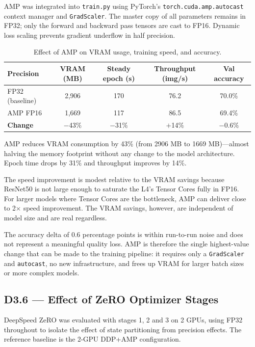 AMP was integrated into \texttt{train.py} using PyTorch's
\texttt{torch.cuda.amp.autocast} context manager and \texttt{GradScaler}.
The master copy of all parameters remains in FP32; only the forward and
backward pass tensors are cast to FP16. Dynamic loss scaling prevents
gradient underflow in half precision.

\begin{table}[h]
\centering
\caption{Effect of AMP on VRAM usage, training speed, and accuracy.}
\label{tab:amp}
\begin{tabular}{lcccc}
\toprule
\textbf{Precision} & \textbf{VRAM (MB)} & \textbf{Steady epoch (s)}
  & \textbf{Throughput (img/s)} & \textbf{Val accuracy} \\
\midrule
FP32 (baseline) & 2{,}906 & 170 & 76.2 & 70.0\% \\
AMP FP16        & 1{,}669 & 117 & 86.5 & 69.4\% \\
\midrule
\textbf{Change} & $-$43\% & $-$31\% & $+$14\% & $-$0.6\% \\
\bottomrule
\end{tabular}
\end{table}

AMP reduces VRAM consumption by 43\% (from 2906 MB to 1669 MB)—almost
halving the memory footprint without any change to the model architecture.
Epoch time drops by 31\% and throughput improves by 14\%.

The speed improvement is modest relative to the VRAM savings because
ResNet50 is not large enough to saturate the L4's Tensor Cores fully in
FP16. For larger models where Tensor Cores are the bottleneck, AMP can
deliver close to 2$\times$ speed improvement. The VRAM savings, however,
are independent of model size and are real regardless.

The accuracy delta of 0.6 percentage points is within run-to-run
noise and does not represent a meaningful quality loss. AMP is therefore
the single highest-value change that can be made to the training pipeline:
it requires only a \texttt{GradScaler} and \texttt{autocast}, no new
infrastructure, and frees up VRAM for larger batch sizes or more complex
models.

\subsection{D3.6 — Effect of ZeRO Optimizer Stages}

DeepSpeed ZeRO was evaluated with stages 1, 2 and 3 on 2 GPUs, using FP32
throughout to isolate the effect of state partitioning from precision effects.
The reference baseline is the 2-GPU DDP+AMP configuration.

